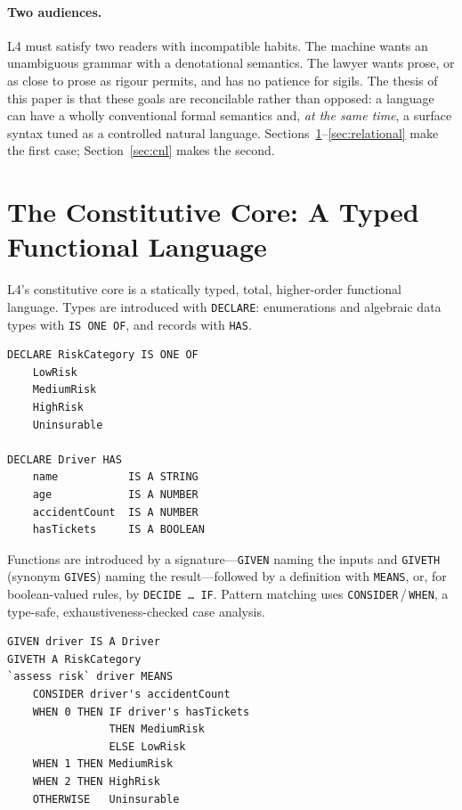 \documentclass[sigconf,nonacm]{acmart}
\newcommand{\code}[1]{\texttt{\small #1}}
\begin{document}
\paragraph{Two audiences.}
L4 must satisfy two readers with incompatible habits. The machine wants an
unambiguous grammar with a denotational semantics. The lawyer wants prose,
or as close to prose as rigour permits, and has no patience for sigils. The
thesis of this paper is that these goals are reconcilable rather than
opposed: a language can have a wholly conventional formal semantics and,
\emph{at the same time}, a surface syntax tuned as a controlled natural
language. Sections~\ref{sec:constitutive}--\ref{sec:relational} make the
first case; Section~\ref{sec:cnl} makes the second.

\section{The Constitutive Core: A Typed Functional Language}\label{sec:constitutive}
L4's constitutive core is a statically typed, total, higher-order
functional language. Types are introduced with \code{DECLARE}: enumerations
and algebraic data types with \code{IS ONE OF}, and records with
\code{HAS}.

\begin{lstlisting}
DECLARE RiskCategory IS ONE OF
    LowRisk
    MediumRisk
    HighRisk
    Uninsurable

DECLARE Driver HAS
    name           IS A STRING
    age            IS A NUMBER
    accidentCount  IS A NUMBER
    hasTickets     IS A BOOLEAN
\end{lstlisting}

Functions are introduced by a signature---\code{GIVEN} naming the inputs and
\code{GIVETH} (synonym \code{GIVES}) naming the result---followed by a
definition with \code{MEANS}, or, for boolean-valued rules, by
\code{DECIDE\,\ldots\,IF}. Pattern matching uses \code{CONSIDER}\,/\,\code{WHEN},
a type-safe, exhaustiveness-checked case analysis.

\begin{lstlisting}
GIVEN driver IS A Driver
GIVETH A RiskCategory
`assess risk` driver MEANS
    CONSIDER driver's accidentCount
    WHEN 0 THEN IF driver's hasTickets
                THEN MediumRisk
                ELSE LowRisk
    WHEN 1 THEN MediumRisk
    WHEN 2 THEN HighRisk
    OTHERWISE   Uninsurable
\end{lstlisting}
\end{document}
